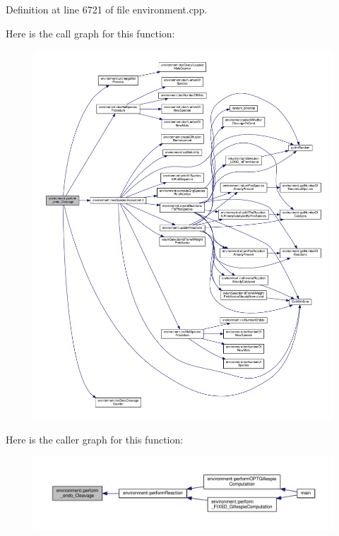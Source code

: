 Definition at line 6721 of file environment.\-cpp.



Here is the call graph for this function\-:\nopagebreak
\begin{figure}[H]
\begin{center}
\leavevmode
\includegraphics[width=350pt]{a00011_ade26b82a3b48a5bda7e5751cbfd31b04_cgraph}
\end{center}
\end{figure}




Here is the caller graph for this function\-:\nopagebreak
\begin{figure}[H]
\begin{center}
\leavevmode
\includegraphics[width=350pt]{a00011_ade26b82a3b48a5bda7e5751cbfd31b04_icgraph}
\end{center}
\end{figure}


